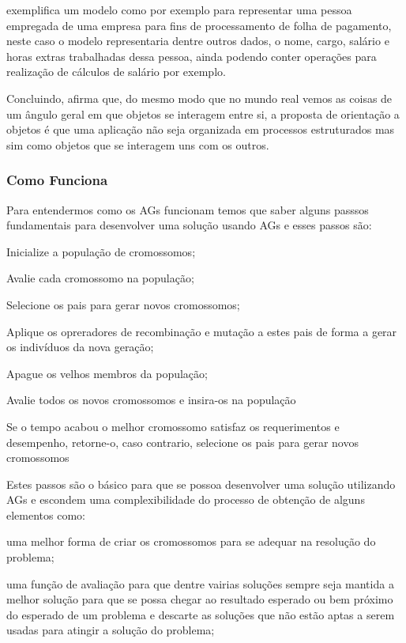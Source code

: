 \par {}
exemplifica um modelo como por exemplo para representar uma pessoa empregada de
uma empresa para fins de processamento de folha de pagamento, neste caso o
modelo representaria dentre outros dados, o nome, cargo, salário e horas extras
trabalhadas dessa pessoa, ainda podendo conter operações para realização
de cálculos de salário por exemplo.


\par Concluindo,  afirma que, do mesmo modo 
que no mundo real vemos as coisas de um ângulo geral em que objetos se
interagem entre si, a proposta de orientação a objetos é que uma  
aplicação não seja organizada em processos estruturados mas
sim como objetos que se interagem uns com os outros.

\subsubsection{Como Funciona}

\par Para entendermos como os AGs funcionam temos que saber alguns passsos
fundamentais para desenvolver uma solução usando AGs e esses passos são:
\item Inicialize a população de cromossomos;
\item Avalie cada cromossomo na população;
\item Selecione os pais para gerar novos cromossomos;
\item Aplique os opreradores de recombinação e mutação a estes pais de forma a
gerar os indivíduos da nova geração;
\item Apague os velhos membros da população;
\item Avalie todos os novos cromossomos e insira-os na população
\item Se o tempo acabou o melhor cromossomo satisfaz os requerimentos e
desempenho, retorne-o, caso contrario, selecione os pais para gerar novos
cromossomos

\par Estes passos são o básico para que se possoa desenvolver uma solução
utilizando AGs e escondem uma complexibilidade do processo de obtenção de alguns
elementos como:
\item uma melhor forma de criar os cromossomos para se adequar na resolução do
problema;
\item uma função de avaliação para que dentre vairias soluções
sempre seja mantida a melhor solução para que se possa chegar ao resultado
esperado ou bem próximo do esperado de um problema e descarte as soluções que
não estão aptas a serem usadas para atingir a solução do problema;
\item 



